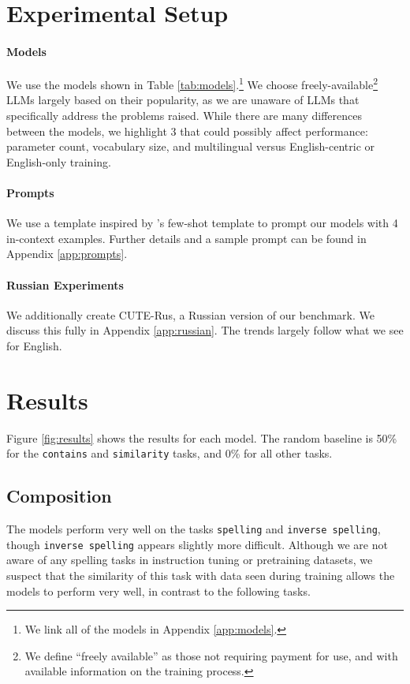 \section{Experimental Setup}

\paragraph{Models}
We use the models shown in Table \ref{tab:models}.\footnote{We link all of the models in Appendix \ref{app:models}.} We choose freely-available\footnote{We define ``freely available'' as those not requiring payment for use, and with available information on the training process.} LLMs largely based on their popularity, as we are unaware of LLMs that specifically address the problems raised. While there are many differences between the models, we highlight 3 that could possibly affect performance: parameter count, vocabulary size, and multilingual versus English-centric or English-only training. 

\paragraph{Prompts}
We use a template inspired by \citet{bsharat2023principled}'s few-shot template to prompt our models with 4 in-context examples. Further details and a sample prompt can be found in Appendix \ref{app:prompts}.

\paragraph{Russian Experiments} We additionally create CUTE-Rus, a Russian version of our benchmark. We discuss this fully in Appendix \ref{app:russian}. The trends largely follow what we see for English.

\section{Results}
Figure \ref{fig:results} shows the results for each model. The random baseline is 50\% for the \texttt{contains} and \texttt{similarity} tasks, and 0\% for all other tasks.

\subsection{Composition} 
The models perform very well on the tasks \texttt{spelling} and \texttt{inverse spelling}, though \texttt{inverse spelling} appears slightly more difficult. Although we are not aware of any spelling tasks in instruction tuning or pretraining datasets, we suspect that the similarity of this task with data seen during training allows the models to perform very well, in contrast to the following tasks. 

